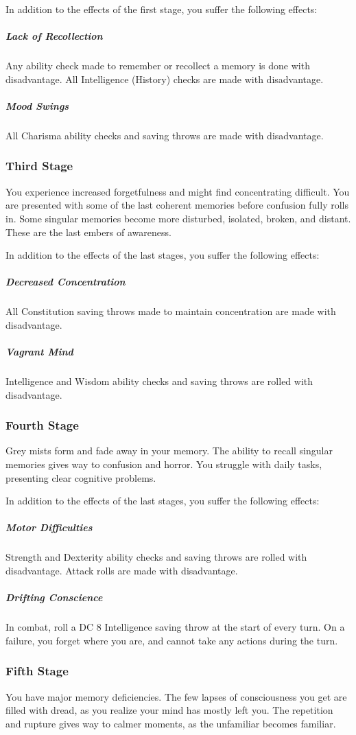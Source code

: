     In addition to the effects of the first stage, you suffer the following effects:
    \subparagraph{Lack of Recollection} Any ability check made to remember or recollect a memory is done with disadvantage.
    All Intelligence (History) checks are made with disadvantage.
    \subparagraph{Mood Swings} All Charisma ability checks and saving throws are made with disadvantage.

    \subsubsection{Third Stage}
    You experience increased forgetfulness and might find concentrating difficult.
    You are presented with some of the last coherent memories before confusion fully rolls in.
    Some singular memories become more disturbed, isolated, broken, and distant.
    These are the last embers of awareness.

    In addition to the effects of the last stages, you suffer the following effects:
    \subparagraph{Decreased Concentration} All Constitution saving throws made to maintain concentration are made with disadvantage.
    \subparagraph{Vagrant Mind} Intelligence and Wisdom ability checks and saving throws are rolled with disadvantage.

    \subsubsection{Fourth Stage}
    Grey mists form and fade away in your memory.
    The ability to recall singular memories gives way to confusion and horror.
    You struggle with daily tasks, presenting clear cognitive problems.

    In addition to the effects of the last stages, you suffer the following effects:
    \subparagraph{Motor Difficulties} Strength and Dexterity ability checks and saving throws are rolled with disadvantage.
    Attack rolls are made with disadvantage.
    \subparagraph{Drifting Conscience} In combat, roll a DC 8 Intelligence saving throw at the start of every turn.
    On a failure, you forget where you are, and cannot take any actions during the turn.

    \subsubsection{Fifth Stage}
    You have major memory deficiencies.
    The few lapses of consciousness you get are filled with dread, as you realize your mind has mostly left you.
    The repetition and rupture gives way to calmer moments, as the unfamiliar becomes familiar.

